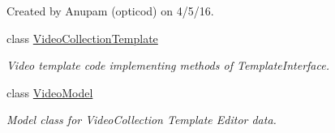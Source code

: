 \begin{DoxyCompactItemize}
\begin{DoxyCompactList}
Created by Anupam (opticod) on 4/5/16. \end{DoxyCompactList}\item 
class \hyperlink{classorg_1_1buildmlearn_1_1toolkit_1_1templates_1_1VideoCollectionTemplate}{Video\+Collection\+Template}
\begin{DoxyCompactList}\small\item\em Video template code implementing methods of Template\+Interface. \end{DoxyCompactList}\item 
class \hyperlink{classorg_1_1buildmlearn_1_1toolkit_1_1templates_1_1VideoModel}{Video\+Model}
\begin{DoxyCompactList}\small\item\em Model class for Video\+Collection Template Editor data. \end{DoxyCompactList}\end{DoxyCompactItemize}
